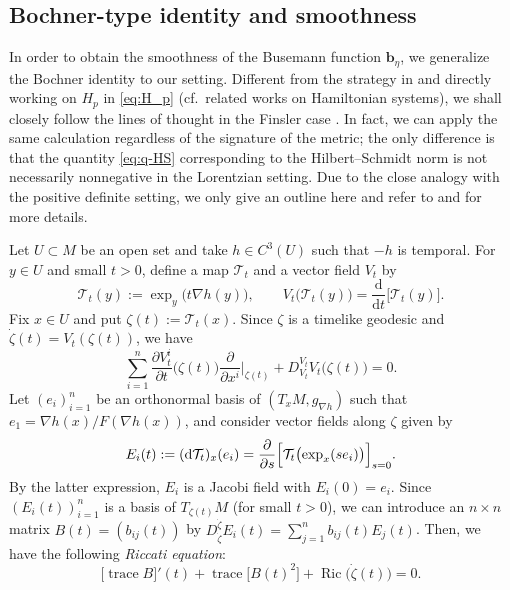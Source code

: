 \documentclass[a4paper,11pt]{article}
\numberwithin{equation}{section}
\theoremstyle{definition}
\theoremstyle{plain}
\newcommand{\del}{\partial}
\newcommand{\dd}{\mathrm{d}}
\newcommand{\cT}{\ensuremath{\mathcal{T}}}
\newcommand{\bb}{\ensuremath{\mathbf{b}}}
\def\Ric{\mathop{\mathrm{Ric}}\nolimits}
\def\trace{\mathop{\mathrm{trace}}\nolimits}
\begin{document}
\subsection{Bochner-type identity and smoothness}\label{ssc:Bochner}

In order to obtain the smoothness of the Busemann function $\bb_\eta$, we generalize the Bochner identity to our setting.
Different from the strategy in  \cite{MS:22} and \cite{quintet} directly working on $H_p$ in \eqref{eq:H_p} (cf.\ related works \cite{Lee,Oham} on Hamiltonian systems), we shall closely follow the lines of thought in the Finsler case \cite{Obook,OSbw}.
In fact, we can apply the same calculation regardless of the signature of the metric; the only difference is that the quantity \eqref{eq:q-HS} corresponding to the Hilbert--Schmidt norm is not necessarily nonnegative in the Lorentzian setting.
Due to the close analogy with the positive definite setting, we only give an outline here and refer to \cite[\S 3.1]{OSbw} and \cite[\S 12.2]{Obook} for more details.

Let $U \subset M$ be an open set and take $h \in C^3(U)$ such that $-h$ is temporal.
For $y \in U$ and small $t>0$, define a map $\cT_t$ and a vector field $V_t$ by
\[ \cT_t(y) :=\exp_y\bigl( t\nabla h(y) \bigr), \qquad
V_t\bigl( \cT_t(y) \bigr) =\frac{\dd}{\dd t}\bigl[ \cT_t(y) \bigr]. \]
Fix $x \in U$ and put $\zeta(t):=\cT_t(x)$.
Since $\zeta$ is a timelike geodesic and $\dot{\zeta}(t)=V_t(\zeta(t))$, we have
\begin{equation}\label{eq:V_t}
\sum_{i=1}^n \frac{\del V_t^i}{\del t}\bigl( \zeta(t) \bigr) \frac{\del}{\del x^i}\Big|_{\zeta(t)}
 +D^{V_t}_{V_t} V_t \bigl( \zeta(t) \bigr) =0.
\end{equation}
Let $(e_i)_{i=1}^n$ be an orthonormal basis of $(T_xM,g_{\nabla h})$
such that $e_1=\nabla h(x)/F(\nabla h(x))$,
and consider vector fields along $\zeta$ given by
\[ E_i(t) :=(\dd \cT_t)_x (e_i) =\frac{\del}{\del s}\Bigl[ \cT_t\bigl( \exp_x(se_i) \bigr) \Bigr]_{s=0}. \]
By the latter expression, $E_i$ is a Jacobi field with $E_i(0)=e_i$.
Since $(E_i(t))_{i=1}^n$ is a basis of $T_{\zeta(t)}M$ (for small $t>0$), we can introduce an $n \times n$ matrix $B(t)=(b_{ij}(t))$ by $D^{\dot{\zeta}}_{\dot{\zeta}} E_i(t)=\sum_{j=1}^n b_{ij}(t) E_j(t)$.
Then, we have the following \emph{Riccati equation}:
\begin{equation}\label{eq:Riccati}
\bigl[ \trace B \bigr]'(t) +\trace\bigl[ B(t)^2 \bigr] +\Ric\bigl( \dot{\zeta}(t) \bigr) =0.
\end{equation}
\end{document}
